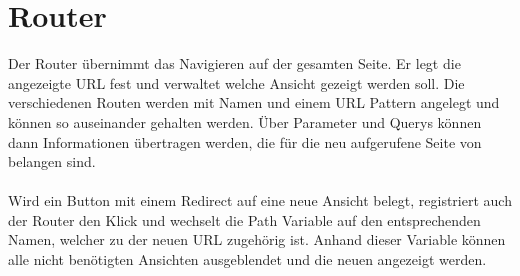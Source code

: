 \documentclass[12pt,					%
							 oneside,			%
							 a4paper,			%
							 halfparskip,		%
							 liststotoc,			%
							 bibtotoc,			%
							 fleqn,				%
							 pointlessnumbers]	%
							 {scrreprt}
\begin{document}
		\section{Router}
	Der Router übernimmt das Navigieren auf der gesamten Seite. Er legt die angezeigte URL fest und verwaltet welche Ansicht gezeigt werden soll. Die verschiedenen Routen werden mit Namen und einem URL Pattern angelegt und können so auseinander gehalten werden. Über Parameter und Querys können dann Informationen übertragen werden, die für die neu aufgerufene Seite von belangen sind.\\
\\
Wird ein Button mit einem Redirect auf eine neue Ansicht belegt, registriert auch der Router den Klick und wechselt die Path Variable auf den entsprechenden Namen, welcher zu der neuen URL zugehörig ist. Anhand dieser Variable können alle nicht benötigten Ansichten ausgeblendet und die neuen angezeigt werden.

				

\end{document}
